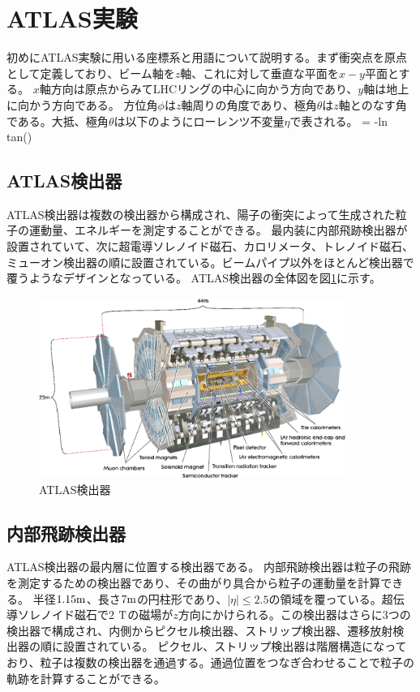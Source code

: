 \section{ATLAS実験}
初めにATLAS実験に用いる座標系と用語について説明する。まず衝突点を原点として定義しており、ビーム軸を$z$軸、これに対して垂直な平面を$x-y$平面とする。
$x$軸方向は原点からみてLHCリングの中心に向かう方向であり、$y$軸は地上に向かう方向である。
方位角$\phi$は$z$軸周りの角度であり、極角$\theta$は$z$軸とのなす角である。大抵、極角$\theta$は以下のようにローレンツ不変量$\eta$で表される。
\bbb
\eta = -\rm{ln tan\left(\right)}
\eee


\subsection{ATLAS検出器}
ATLAS検出器は複数の検出器から構成され、陽子の衝突によって生成された粒子の運動量、エネルギーを測定することができる。
最内装に内部飛跡検出器が設置されていて、次に超電導ソレノイド磁石、カロリメータ、トレノイド磁石、ミューオン検出器の順に設置されている。ビームパイプ以外をほとんど検出器で覆うようなデザインとなっている。
ATLAS検出器の全体図を図\ref{atlas_detector}に示す。

\begin{figure}[bpt]\centering
\includegraphics[width=10cm]{atlas_detector}
\caption[ATLAS検出器]{ATLAS検出器\cite{1-2}}
\label{atlas_detector}
\end{figure}


\subsection{内部飛跡検出器}
ATLAS検出器の最内層に位置する検出器である。
内部飛跡検出器は粒子の飛跡を測定するための検出器であり、その曲がり具合から粒子の運動量を計算できる。
半径$1.15 \rm{m}$、長さ$7 \rm{m}$の円柱形であり、$|\eta|\leq 2.5$の領域を覆っている。超伝導ソレノイド磁石で2 $\rm{T}$の磁場が$z$方向にかけられる。この検出器はさらに3つの検出器で構成され、内側からピクセル検出器、ストリップ検出器、遷移放射検出器の順に設置されている。
ピクセル、ストリップ検出器は階層構造になっており、粒子は複数の検出器を通過する。通過位置をつなぎ合わせることで粒子の軌跡を計算することができる。

